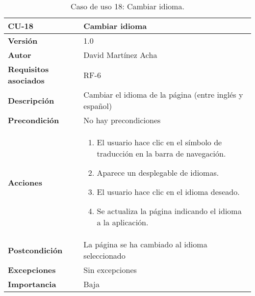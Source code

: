 \begin{table}[p]
	\centering
	\begin{tabularx}{\linewidth}{ p{} p{} }
		\toprule
		\textbf{CU-18}    & \textbf{Cambiar idioma}\\
		\toprule
		\textbf{Versión}              & 1.0    \\
		\textbf{Autor}                & David Martínez Acha \\
		\textbf{Requisitos asociados} & RF-6 \\
		\textbf{Descripción}          & Cambiar el idioma de la página (entre inglés y español) \\
		\textbf{Precondición}         & No hay precondiciones \\
		\textbf{Acciones}             &
		\begin{enumerate}
			\def\labelenumi{\arabic{enumi}.}
			\tightlist
			\item El usuario hace clic en el símbolo de traducción en la barra de navegación.
            \item Aparece un desplegable de idiomas.
            \item El usuario hace clic en el idioma deseado.
            \item Se actualiza la página indicando el idioma a la aplicación.
		\end{enumerate}\\
		\textbf{Postcondición}        & La página se ha cambiado al idioma seleccionado \\
		\textbf{Excepciones}          & Sin excepciones \\
		\textbf{Importancia}          & Baja \\
		\bottomrule
	\end{tabularx}
	\caption{Caso de uso 18: Cambiar idioma.}
\end{table}

